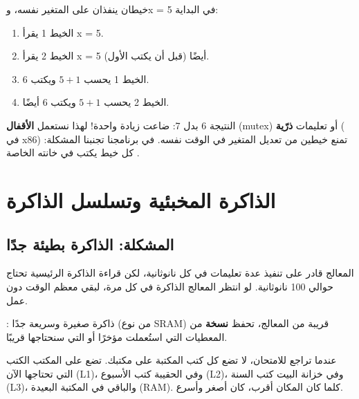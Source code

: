 \begin{mithal}
    خيطان ينفذان  على المتغير نفسه، و\textenglish{x = 5} في البداية:
    \begin{enumerate}
        \item الخيط 1 يقرأ \textenglish{x = 5}.
        \item الخيط 2 يقرأ \textenglish{x = 5} أيضًا (قبل أن يكتب الأول).
        \item الخيط 1 يحسب $5 + 1$ ويكتب 6.
        \item الخيط 2 يحسب $5 + 1$ ويكتب 6 أيضًا.
    \end{enumerate}
    النتيجة 6 بدل 7: ضاعت زيادة واحدة! لهذا نستعمل \textbf{الأقفال} \textenglish{(mutex)} أو تعليمات \textbf{ذرّية}
    ( في \textenglish{x86}) تمنع خيطين من تعديل المتغير في الوقت نفسه. في برنامجنا تجنبنا المشكلة:
    كل خيط يكتب في خانته الخاصة .
\end{mithal}

\section{الذاكرة المخبئية وتسلسل الذاكرة}

\subsection{المشكلة: الذاكرة بطيئة جدًا}
المعالج قادر على تنفيذ عدة تعليمات في كل نانوثانية، لكن قراءة الذاكرة الرئيسية تحتاج حوالي 100 نانوثانية.
لو انتظر المعالج الذاكرة في كل مرة، لبقي معظم الوقت دون عمل.

\begin{tarif}
    : ذاكرة صغيرة وسريعة جدًا (من نوع
    \textenglish{SRAM}) قريبة من المعالج، تحفظ \textbf{نسخة} من المعطيات التي استُعملت مؤخرًا أو التي سنحتاجها قريبًا.
\end{tarif}

\begin{tashbih}
    عندما تراجع للامتحان، لا تضع كل كتب المكتبة على مكتبك. تضع على المكتب الكتب التي تحتاجها الآن (\textenglish{L1})،
    وفي الحقيبة كتب الأسبوع (\textenglish{L2})، وفي خزانة البيت كتب السنة (\textenglish{L3})، والباقي في المكتبة
    البعيدة (\textenglish{RAM}). كلما كان المكان أقرب، كان أصغر وأسرع.
\end{tashbih}

